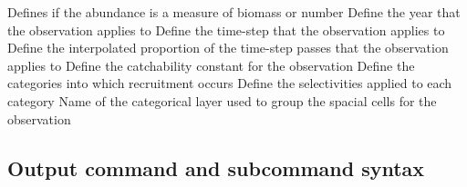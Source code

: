  {Defines if the abundance is a measure of biomass or number}
 {Define the year that the observation applies to}
 {Define the time-step that the observation applies to}
 {Define the interpolated proportion of the time-step passes that the observation applies to}
 {Define the catchability constant for the observation}
 {Define the categories into which recruitment occurs}
 {Define the selectivities applied to each category}
 {Name of the categorical layer used to group the spacial cells for the observation}
\subsection{Output command and subcommand syntax}
